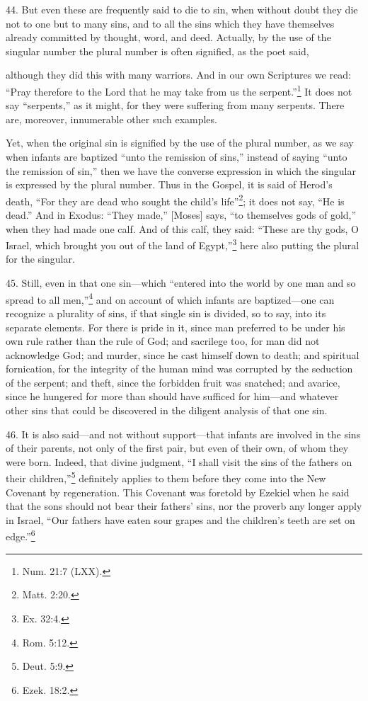 44. But even these are frequently said to die to sin, when without doubt they die not to one but to many sins, and to all the sins which they have themselves already committed by thought, word, and deed. Actually, by the use of the singular number the plural number is often signified, as the poet said,

although they did this with many warriors. And in our own Scriptures we read: ``Pray therefore to the Lord that he may take from us the serpent.''\footnote{Num. 21:7 (LXX).} It does not say ``serpents,'' as it might, for they were suffering from many serpents. There are, moreover, innumerable other such examples.

Yet, when the original sin is signified by the use of the plural number, as we say when infants are baptized ``unto the remission of sins,'' instead of saying ``unto the remission of sin,'' then we have the converse expression in which the singular is expressed by the plural number. Thus in the Gospel, it is said of Herod's death, ``For they are dead who sought the child's life''\footnote{Matt. 2:20.}; it does not say, ``He is dead.'' And in Exodus: ``They made,'' [Moses] says, ``to themselves gods of gold,'' when they had made one calf. And of this calf, they said: ``These are thy gods, O Israel, which brought you out of the land of Egypt,''\footnote{Ex. 32:4.} here also putting the plural for the singular.

45. Still, even in that one sin—which ``entered into the world by one man and so spread to all men,''\footnote{Rom. 5:12.} and on account of which infants are baptized—one can recognize a plurality of sins, if that single sin is divided, so to say, into its separate elements. For there is pride in it, since man preferred to be under his own rule rather than the rule of God; and sacrilege too, for man did not acknowledge God; and murder, since he cast himself down to death; and spiritual fornication, for the integrity of the human mind was corrupted by the seduction of the serpent; and theft, since the forbidden fruit was snatched; and avarice, since he hungered for more than should have sufficed for him—and whatever other sins that could be discovered in the diligent analysis of that one sin.

46. It is also said—and not without support—that infants are involved in the sins of their parents, not only of the first pair, but even of their own, of whom they were born. Indeed, that divine judgment, ``I shall visit the sins of the fathers on their children,''\footnote{Deut. 5:9.} definitely applies to them before they come into the New Covenant by regeneration. This Covenant was foretold by Ezekiel when he said that the sons should not bear their fathers' sins, nor the proverb any longer apply in Israel, ``Our fathers have eaten sour grapes and the children's teeth are set on edge.''\footnote{Ezek. 18:2.}

